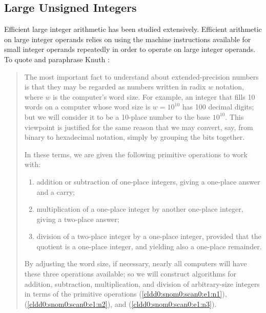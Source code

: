 \subsection{Large Unsigned Integers}
\label{cldd0:srnm0:srlu0}

Efficient large integer arithmetic has been studied 
extensively.  Efficient arithmetic on large integer operands 
relies on using the machine instructions available for small 
integer operands repeatedly in order to operate on large 
integer operands.  To quote and paraphrase Knuth \cite[pp.  
265-266]{bibref:b:TaocpVolume2}: 

\begin{em}
\begin{quote}
The most important fact to understand about 
extended-precision numbers is that they may be regarded as 
numbers written in radix $w$ notation, where $w$ is the 
computer's word size.  For example, an integer that fills 10 
words on a computer whose word size is $w=10^{10}$ has 100 
decimal digits; but we will consider it to be a 10-place 
number to the base $10^{10}$.  This viewpoint is justified 
for the same reason that we may convert, say, from binary to 
hexadecimal notation, simply by grouping the bits together.  

In these terms, we are given the following primitive 
operations to work with: 

\begin{enumerate}
\item \label{cldd0:snom0:scan0:e1:n1}addition or subtraction
      of one-place integers, giving a one-place answer and a 
      carry;
\item \label{cldd0:snom0:scan0:e1:n2}multiplication of a
      one-place integer by another one-place integer, giving 
      a two-place answer;
\item \label{cldd0:snom0:scan0:e1:n3}division of a two-place
      integer by a one-place integer, provided that the 
      quotient is a one-place integer, and yielding also a 
      one-place remainder.
\end{enumerate}

By adjusting the word size, if necessary, nearly all 
computers will have these three operations available; so we 
will construct algorithms for addition, subtraction, 
multiplication, and division of arbitrary-size integers in 
terms of the primitive operations 
(\ref{cldd0:snom0:scan0:e1:n1}), 
(\ref{cldd0:snom0:scan0:e1:n2}), and 
(\ref{cldd0:snom0:scan0:e1:n3}).  
\end{quote}
\end{em}

